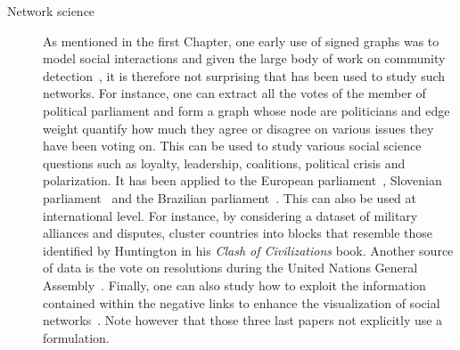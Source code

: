 \begin{description}
   \item[Network science]
      As mentioned in the first Chapter, one early use of signed graphs was to model social
      interactions and given the large body of work on community
      detection~\autocite{FortunatoSurvey10}, it is therefore not surprising that \pcc{} has been
      used to study such networks. For instance, one can extract all the votes of the member of
      political parliament and form a graph whose node are politicians and edge weight quantify how
      much they agree or disagree on various issues they have been voting on. This can be used to
      study various social science questions such as loyalty, leadership, coalitions, political
      crisis and polarization. It has been applied to the European
      parliament~\autocite{Mendonca2015}, Slovenian parliament~\autocite{Jiang2015} and the
      Brazilian parliament~\autocites{BrazilCC17}. This can also be used at international level. For
      instance, by considering a dataset of military alliances and disputes, \textcite{Traag2009}
      cluster countries into blocks that resemble those identified by Huntington in his \emph{Clash
      of Civilizations} book. Another source of data is the vote on resolutions during the United
      Nations General Assembly~\autocite{CommunityUN12}. Finally, one can also study how to exploit
      the information contained within the negative links to enhance the visualization of social
      networks~\autocite{Luca10}. Note however that those three last papers not explicitly use a
      \pcc{} formulation.


\end{description}
